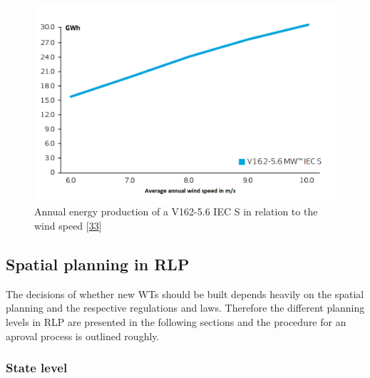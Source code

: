 \documentclass[a4paper,11pt]{article}
\begin{document}
\begin{figure}[H]

{\centering \includegraphics[width=1\linewidth,height=0.33\textheight]{figures/V162} 

}

\caption{Annual energy production of a V162-5.6 IEC S in relation to the wind speed {[}\protect\hyperlink{ref-VestasWindSystemsAS.2019}{33}{]}}\label{fig:v162}
\end{figure}
\hypertarget{spatial-planning-in-rlp}{%
\subsection{Spatial planning in RLP}\label{spatial-planning-in-rlp}}

The decisions of whether new WTs should be built depends heavily on the spatial planning and the respective regulations and laws. Therefore the different planning levels in RLP are presented in the following sections and the procedure for an aproval process is outlined roughly.

\hypertarget{state-level}{%
\subsubsection{State level}\label{state-level}}
\end{document}
